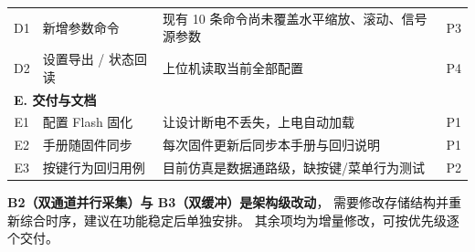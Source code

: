 \documentclass[UTF8,a4paper,11pt]{ctexart}
\begin{document}
\begin{center}
\begin{tabular}{clp{7.0cm}c}
\midrule
D1 & 新增参数命令 & 现有 10 条命令尚未覆盖水平缩放、滚动、信号源参数 & P3\\
D2 & 设置导出 / 状态回读 & 上位机读取当前全部配置 & P4\\
\midrule
\multicolumn{4}{l}{\textbf{E. 交付与文档}}\\
\midrule
E1 & 配置 Flash 固化 & 让设计断电不丢失，上电自动加载 & P1\\
E2 & 手册随固件同步 & 每次固件更新后同步本手册与回归说明 & P1\\
E3 & 按键行为回归用例 & 目前仿真是数据通路级，缺按键/菜单行为测试 & P2\\
\bottomrule
\end{tabular}
\end{center}

\begin{tipbox}
\textbf{B2（双通道并行采集）与 B3（双缓冲）是架构级改动}，
需要修改存储结构并重新综合时序，建议在功能稳定后单独安排。
其余项均为增量修改，可按优先级逐个交付。
\end{tipbox}
\end{document}
